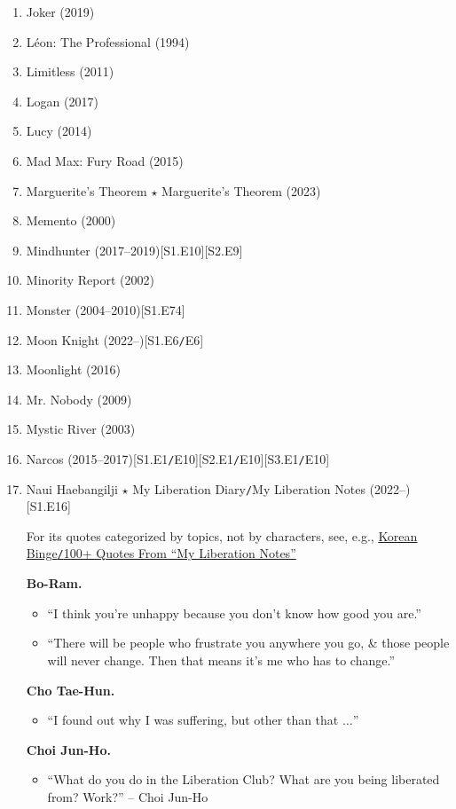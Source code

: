 \documentclass{article}
\begin{document}
\begin{enumerate}
	\item {\sc Joker} (2019)
	\item {\sc L\'eon: The Professional} (1994)
	\item {\sc Limitless} (2011)
	\item {\sc Logan} (2017)
	\item {\sc Lucy} (2014)
	\item {\sc Mad Max: Fury Road} (2015)
	\item Marguerite's Theorem $\star$ Marguerite's Theorem (2023)
	\item {\sc Memento} (2000)
	\item {\sc Mindhunter} (2017--2019)\hfill[S1.E10][S2.E9]
	\item {\sc Minority Report} (2002)
	\item {\sc Monster} (2004--2010)\hfill[S1.E74]
	\item Moon Knight (2022--)\hfill[S1.E6{\tt/}E6]
	\item {\sc Moonlight} (2016)
	\item {\sc Mr. Nobody} (2009)
	\item {\sc Mystic River} (2003)
	\item Narcos (2015--2017)\hfill[S1.E1{\tt/}E10][S2.E1{\tt/}E10][S3.E1{\tt/}E10]
	\item Naui Haebangilji $\star$ My Liberation Diary{\tt/}My Liberation Notes (2022--)\hfill[S1.E16]

	For its quotes categorized by topics, not by characters, see, e.g., \href{https://korean-binge.com/2022/04/12/100-quotes-from-my-liberation-notes/}{Korean Binge{\tt/}100+ Quotes From ``My Liberation Notes''}

	{\bf Bo-Ram.}
	\begin{itemize}
		\item ``I think you're unhappy because you don't know how good you are.''
		\item ``There will be people who frustrate you anywhere you go, \& those people will never change. Then that means it's me who has to change.''
	\end{itemize}
	{\bf Cho Tae-Hun.}
	\begin{itemize}
		\item ``I found out why I was suffering, but other than that $\ldots$''
	\end{itemize}
	{\bf Choi Jun-Ho.}
	\begin{itemize}
		\item ``What do you do in the Liberation Club? What are you being liberated from? Work?'' -- Choi Jun-Ho


\end{itemize}
\end{enumerate}
\end{document}
